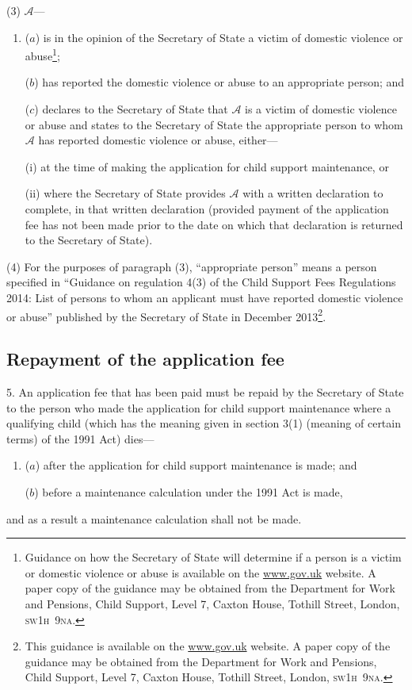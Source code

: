 \documentclass[12pt,a4paper]{article}
\begin{document}
(3) $\mathcal{A}$—
\begin{enumerate}\item[]
($a$) is in the opinion of the Secretary of State a victim of domestic violence or abuse\footnote{Guidance on how the Secretary of State will determine if a person is a victim or domestic violence or abuse is available on the \url{www.gov.uk} website. A paper copy of the guidance may be obtained from the Department for Work and Pensions, Child Support, Level 7, Caxton House, Tothill Street, London, \textsc{\lowercase{SW1H~9NA}}.};

($b$) has reported the domestic violence or abuse to an appropriate person; and

($c$) declares to the Secretary of State that $\mathcal{A}$ is a victim of domestic violence or abuse and states to the Secretary of State the appropriate person to whom $\mathcal{A}$ has reported domestic violence or abuse, either—

(i) at the time of making the application for child support maintenance, or

(ii) where the Secretary of State provides $\mathcal{A}$ with a written declaration to complete, in that written declaration (provided payment of the application fee has not been made prior to the date on which that declaration is returned to the Secretary of State).
\end{enumerate}

(4) For the purposes of paragraph (3), “appropriate person” means a person specified in “Guidance on regulation 4(3) of the Child Support Fees Regulations 2014: List of persons to whom an applicant must have reported domestic violence or abuse” published by the Secretary of State in December 2013\footnote{This guidance is available on the \url{www.gov.uk} website. A paper copy of the guidance may be obtained from the Department for Work and Pensions, Child Support, Level 7, Caxton House, Tothill Street, London, \textsc{\lowercase{SW1H~9NA}}.}.

\subsection[5. Repayment of the application fee]{Repayment of the application fee}

5.  An application fee that has been paid must be repaid by the Secretary of State to the person who made the application for child support maintenance where a qualifying child (which has the meaning given in section 3(1) (meaning of certain terms) of the 1991 Act) dies—
\begin{enumerate}\item[]
($a$) after the application for child support maintenance is made; and

($b$) before a maintenance calculation under the 1991 Act is made,
\end{enumerate}
and as a result a maintenance calculation shall not be made.
\end{document}
